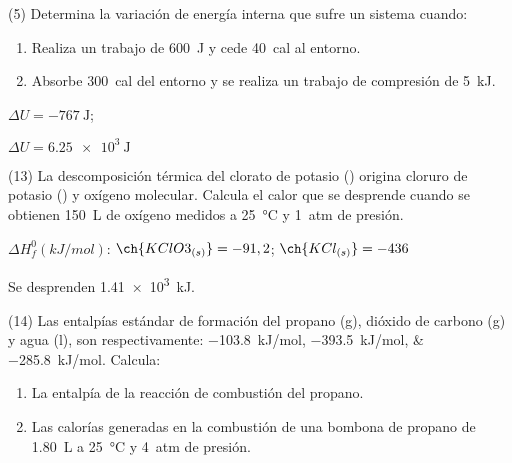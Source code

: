 \documentclass[10pt]{article}
\newenvironment{gexdatos}{
      \noindent\makebox[0pt][r]{\textit{Datos:}}
    }{\vspace{5pt}}
\begin{document}
\begin{multicols}{2}


\begin{exercise}[
    tags    = {},
    topics  = {química, termodinámica, termoquímica},
    source  = {FQ 1B MGH 2016, p159, e5},
  ]
  (5) Determina la variación de energía interna que sufre un sistema
  cuando:
  \begin{enumerate}
    \item Realiza un trabajo de \SI{600}{\joule} y cede \SI{40}{cal} al entorno.
    \item Absorbe \SI{300}{cal} del entorno y se realiza un trabajo de compresión de \SI{5}{\kilo\joule}.
  \end{enumerate}
\end{exercise}

\begin{solution}
  \begin{enumerate*}
    \item \( \Delta U = \SI{-767}{\joule} \); \item \( \Delta U = \SI{6.25e3}{\joule} \)
  \end{enumerate*}
\end{solution}




\begin{exercise}[
    tags    = {},
    topics  = {química, termodinámica, termoquímica},
    source  = {FQ 1B MGH 2016, p165, e13},
  ]
  (13) La descomposición térmica del clorato de potasio ()
  origina cloruro de potasio () y oxígeno molecular. Calcula
  el calor que se desprende cuando se obtienen \SI{150}{\liter} de
  oxígeno medidos a \SI{25}{\celsius} y \SI{1}{atm} de presión.

  \begin{gexdatos}
    \( \Delta H^0_f (\si{kJ/mol}) \): \( \ch{KClO3_{(s)}} = -91,2 \); \( \ch{KCl_{(s)}} = -436 \)
  \end{gexdatos}
\end{exercise}

\begin{solution}
  Se desprenden \SI{1.41e3}{kJ}.
\end{solution}




\begin{exercise}[
    tags    = {},
    topics  = {química, termodinámica, termoquímica},
    source  = {FQ 1B MGH 2016, p165, e6},
  ]
  (14) Las entalpías estándar de formación del propano (g),
  dióxido de carbono (g) y agua (l), son respectivamente:
  \SIlist{-103,8;-393,5;-285,8}{kJ/mol}. Calcula:
  \begin{enumerate}
    \item La entalpía de la reacción de combustión del propano.
    \item Las calorías generadas en la combustión de una bombona de propano de \SI{1.80}{\liter} a \SI{25}{\celsius} y \SI{4}{atm} de presión.
  \end{enumerate}
\end{exercise}


\end{multicols}
\end{document}
